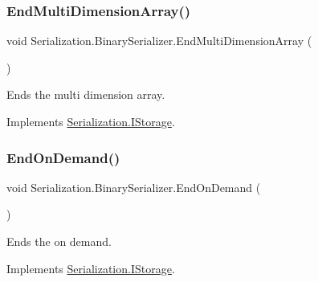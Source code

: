 \subsubsection{\texorpdfstring{End\+Multi\+Dimension\+Array()}{EndMultiDimensionArray()}}
{\footnotesize\ttfamily void Serialization.\+Binary\+Serializer.\+End\+Multi\+Dimension\+Array (\begin{DoxyParamCaption}{ }\end{DoxyParamCaption})\hspace{0.3cm}{\ttfamily [inline]}}



Ends the multi dimension array. 



Implements \hyperlink{interface_serialization_1_1_i_storage_aace2c7b698493c52356bff6422d37f74}{Serialization.\+I\+Storage}.

\mbox{\label{class_serialization_1_1_binary_serializer_a6a8d02da39538d740b84832d03a58766}} 
\subsubsection{\texorpdfstring{End\+On\+Demand()}{EndOnDemand()}}
{\footnotesize\ttfamily void Serialization.\+Binary\+Serializer.\+End\+On\+Demand (\begin{DoxyParamCaption}{ }\end{DoxyParamCaption})\hspace{0.3cm}{\ttfamily [inline]}}



Ends the on demand. 



Implements \hyperlink{interface_serialization_1_1_i_storage_a40adb4b1e7b959e0b3baa509d3ce16f7}{Serialization.\+I\+Storage}.

\mbox{\label{class_serialization_1_1_binary_serializer_aeacb7cb7b4c86a1ad310ac1b0674c18c}} 
